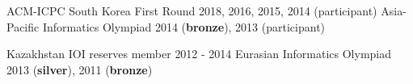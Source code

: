 \parbox{0.45\textwidth}{
    \cvachievement
    {}
    {ACM-ICPC South Korea First Round}
    {2018, 2016, 2015, 2014 (participant)}
    \cvachievement
    {\faTrophy}
    {Asia-Pacific Informatics Olympiad}
    {2014 (\textbf{bronze}), 2013 (participant)}}
\parbox{0.5\textwidth}{
    \cvachievement
    {}
    {Kazakhstan IOI reserves member}
    {2012 - 2014}
    \cvachievement
    {\faTrophy}
    {Eurasian Informatics Olympiad}
    {2013 (\textbf{silver}), 2011 (\textbf{bronze})}}
